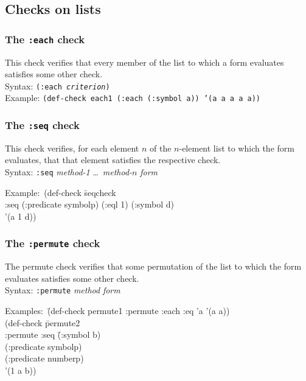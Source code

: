 \documentclass{article}
\begin{document}
\subsection{Checks on lists}

\subsubsection{The \texttt{:each} check}
This check verifies that every member of the list to which a form
evaluates satisfies some other check.
\\ Syntax: \texttt{(:each \emph{criterion})}
\\ Example: \texttt{(def-check each1 (:each (:symbol a)) '(a a a a a))}

\subsubsection{The \texttt{:seq} check }
This check verifies, for each element $n$ of the $n$-element list to
which the form evaluates, that that element satisfies the respective
check.
\\ Syntax: \texttt{:seq} \textit{method-1} \ldots\ \textit{method-$n$} \textit{form}
{\ttfamily\begin{tabbing}
\textrm{Example:}\ (def-check \=seqcheck
\\ \>  :seq (:predicate symbolp) (:eql 1) (:symbol d)
\\ \>  '(a 1 d))
\end{tabbing}}

\subsubsection{The \texttt{:permute} check }
The permute check verifies that some permutation of the list to which
the form evaluates satisfies some other check.
\\ Syntax: \texttt{:permute} \textit{method} \textit{form}
{\ttfamily\begin{tabbing}
\textrm{Examples:}\ \=(def-check permute1 :permute :each :eq 'a '(a a))
\\ \> (def-check \=permute2
\\ \> \>  :permute :seq \=(:symbol b)
\\ \> \>              \>(:predicate symbolp)
\\ \> \>              \>(:predicate numberp)
\\ \> \>'(1 a b))
\end{tabbing}}
\end{document}
